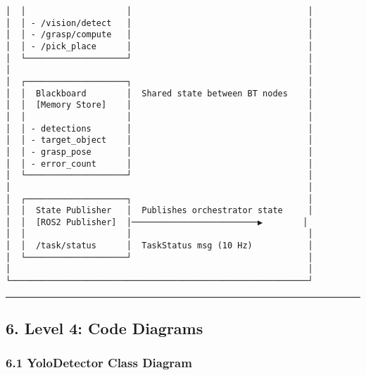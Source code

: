 \documentclass[
]{article}
\begin{document}
\begin{verbatim}
│  │                    │                                   │
│  │ - /vision/detect   │                                   │
│  │ - /grasp/compute   │                                   │
│  │ - /pick_place      │                                   │
│  └────────────────────┘                                   │
│                                                           │
│  ┌────────────────────┐                                   │
│  │  Blackboard        │  Shared state between BT nodes    │
│  │  [Memory Store]    │                                   │
│  │                    │                                   │
│  │ - detections       │                                   │
│  │ - target_object    │                                   │
│  │ - grasp_pose       │                                   │
│  │ - error_count      │                                   │
│  └────────────────────┘                                   │
│                                                           │
│  ┌────────────────────┐                                   │
│  │  State Publisher   │  Publishes orchestrator state     │
│  │  [ROS2 Publisher]  │─────────────────────────▶        │
│  │                    │                                   │
│  │  /task/status      │  TaskStatus msg (10 Hz)           │
│  └────────────────────┘                                   │
│                                                           │
└───────────────────────────────────────────────────────────┘
\end{verbatim}

\begin{center}\rule{0.5\linewidth}{0.5pt}\end{center}

\hypertarget{level-4-code-diagrams}{%
\subsection{6. Level 4: Code Diagrams}\label{level-4-code-diagrams}}

\hypertarget{yolodetector-class-diagram}{%
\subsubsection{6.1 YoloDetector Class
Diagram}\label{yolodetector-class-diagram}}
\end{document}
